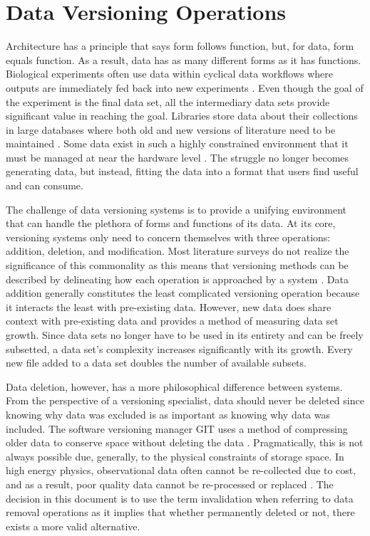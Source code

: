 \section{Data Versioning Operations}

Architecture has a principle that says form follows function, but, for data, form equals function.
As a result, data has as many different forms as it has functions.
Biological experiments often use data within cyclical data workflows where outputs are immediately fed back into new experiments \cite{Tagger2005}.
Even though the goal of the experiment is the final data set, all the intermediary data sets provide significant value in reaching the goal.
Libraries store data about their collections in large databases where both old and new versions of literature need to be maintained \cite{Wiil:2000:RDH:338407.338517}.
Some data exist in such a highly constrained environment that it must be managed at near the hardware level \cite{Flouris04clotho:transparent}.
The struggle no longer becomes generating data, but instead, fitting the data into a format that users find useful and can consume.

The challenge of data versioning systems is to provide a unifying environment that can handle the plethora of forms and functions of its data.
At its core, versioning systems only need to concern themselves with three operations: addition, deletion, and modification.
Most literature surveys do not realize the significance of this commonality as this means that versioning methods can be described by delineating how each operation is approached by a system \cite{Tagger2005} \cite{rohtua}.
Data addition generally constitutes the least complicated versioning operation because it interacts the least with pre-existing data.
However, new data does share context with pre-existing data and provides a method of measuring data set growth.
Since data sets no longer have to be used in its entirety and can be freely subsetted, a data set's complexity increases significantly with its growth.
Every new file added to a data set doubles the number of available subsets.

Data deletion, however, has a more philosophical difference between systems.
From the perspective of a versioning specialist, data should never be deleted since knowing why data was excluded is as important as knowing why data was included.
The software versioning manager GIT uses a method of compressing older data to conserve space without deleting the data \cite{Chacon:2009:PG:1618548}.
Pragmatically, this is not always possible due, generally, to the physical constraints of storage space.
In high energy physics, observational data often cannot be re-collected due to cost, and as a result, poor quality data cannot be re-processed or replaced \cite{Cavanaugh2002}.
The decision in this document is to use the term invalidation when referring to data removal operations as it implies that whether permanently deleted or not, there exists a more valid alternative.


